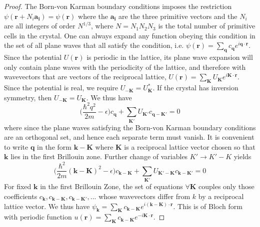\documentclass[a4paper]{article}
\begin{document}
\begin{proof}
The Born-von Karman boundary conditions imposes the restriction $\psi(\mathbf{r}+N_i\mathbf{a_i})=\psi(\mathbf{r})$ where the $\mathbf{a_i}$ are the three primitive vectors and the $N_i$ are all integers of order $N^{1/3}$, where $N=N_1N_2N_3$ is the total number of primitive cells in the crystal. One can always expand any function obeying this condition in the set of all plane waves that all satisfy the condition, i.e. $\psi(\mathbf{r})=\sum_{\mathbf{q}}c_{\mathbf{q}}e^{i\mathbf{q}\cdot\mathbf{r}}$.\\[5pt]
Since the potential $U(\mathbf{r})$ is periodic in the lattice, its plane wave expansion will only contain plane waves with the periodicity of the lattice, and therefore with wavevectors that are vectors of the reciprocal lattice, $U(\mathbf{r})=\sum_\mathbf{K}U_\mathbf{K}e^{i\mathbf{K}\cdot\mathbf{r}}$. Since the potential is real, we require $U_{-\mathbf{K}}=U_{\mathbf{K}}^*$. If the crystal has inversion symmetry, then $U_{-\mathbf{K}}=U_{\mathbf{K}}$. We thus have
$$\bigg(\frac{\hbar^2q^2}{2m}-\epsilon\bigg)c_{\mathbf{q}}+\sum_{\mathbf{K'}}U_{\mathbf{K'}}c_{\mathbf{q}-\mathbf{K'}}=0$$
where since the plane waves satisfying the Born-von Karman boundary conditions are an orthogonal set, and hence each separate term must vanish. It is convenient to write $\mathbf{q}$ in the form $\mathbf{k}-\mathbf{K}$ where $\mathbf{K}$ is a reciprocal lattice vector chosen so that $\mathbf{k}$ lies in the first Brillouin zone. Further change of variables $K'\rightarrow K'-K$ yields
$$\bigg(\frac{\hbar^2}{2m}(\mathbf{k}-\mathbf{K})^2-\epsilon\bigg)c_{\mathbf{k-K}}+\sum_{\mathbf{K'}}U_{\mathbf{K'-K}}c_{\mathbf{k}-\mathbf{K'}}=0$$
For fixed $\mathbf{k}$ in the first Brillouin Zone, the set of equations $\forall\mathbf{K}$ couples only those coefficients $c_{\mathbf{k}},c_{\mathbf{k}-\mathbf{K}},c_{\mathbf{k}-\mathbf{K'}},...$ whose wavevectors differ from $k$ by a reciprocal lattice vector. We thus have $\psi_{\mathbf{k}}=\sum_{\mathbf{K}}c_{\mathbf{k}-\mathbf{K}}e^{i(\mathbf{k}-\mathbf{K})\cdot\mathbf{r}}$. This is of Bloch form with periodic function $u(\mathbf{r})=\sum_{\mathbf{K}}c_{\mathbf{k}-\mathbf{K}}e^{-i\mathbf{K}\cdot\mathbf{r}}$.
\end{proof}
\end{document}
